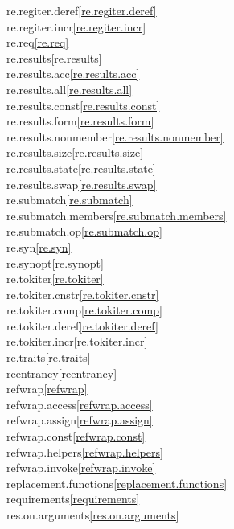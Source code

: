 \begin{multicols}{2}
re.regiter.deref\quad\ref{re.regiter.deref}\\
re.regiter.incr\quad\ref{re.regiter.incr}\\
re.req\quad\ref{re.req}\\
re.results\quad\ref{re.results}\\
re.results.acc\quad\ref{re.results.acc}\\
re.results.all\quad\ref{re.results.all}\\
re.results.const\quad\ref{re.results.const}\\
re.results.form\quad\ref{re.results.form}\\
re.results.nonmember\quad\ref{re.results.nonmember}\\
re.results.size\quad\ref{re.results.size}\\
re.results.state\quad\ref{re.results.state}\\
re.results.swap\quad\ref{re.results.swap}\\
re.submatch\quad\ref{re.submatch}\\
re.submatch.members\quad\ref{re.submatch.members}\\
re.submatch.op\quad\ref{re.submatch.op}\\
re.syn\quad\ref{re.syn}\\
re.synopt\quad\ref{re.synopt}\\
re.tokiter\quad\ref{re.tokiter}\\
re.tokiter.cnstr\quad\ref{re.tokiter.cnstr}\\
re.tokiter.comp\quad\ref{re.tokiter.comp}\\
re.tokiter.deref\quad\ref{re.tokiter.deref}\\
re.tokiter.incr\quad\ref{re.tokiter.incr}\\
re.traits\quad\ref{re.traits}\\
reentrancy\quad\ref{reentrancy}\\
refwrap\quad\ref{refwrap}\\
refwrap.access\quad\ref{refwrap.access}\\
refwrap.assign\quad\ref{refwrap.assign}\\
refwrap.const\quad\ref{refwrap.const}\\
refwrap.helpers\quad\ref{refwrap.helpers}\\
refwrap.invoke\quad\ref{refwrap.invoke}\\
replacement.functions\quad\ref{replacement.functions}\\
requirements\quad\ref{requirements}\\
res.on.arguments\quad\ref{res.on.arguments}\\

\end{multicols}
